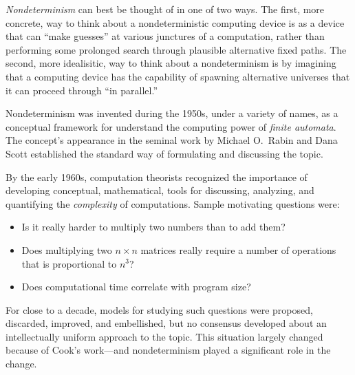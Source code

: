 \medskip

{\it Nondeterminism} can best be thought of in one of two ways.  The
first, more concrete, way to think about a nondeterministic computing
device is as a device that can ``make guesses'' at various junctures
of a computation, rather than performing some prolonged search through
plausible alternative fixed paths.  The second, more idealisitic, way
to think about a nondeterminism is by imagining that a computing
device has the capability of spawning alternative universes that it
can proceed through ``in parallel.''

\bigskip

\noindent {}
\bigskip

\noindent 
Nondeterminism was invented during the 1950s, under a variety of
names, as a conceptual framework for understand the computing power of
{\it finite automata}.   The concept's
appearance in the seminal work \cite{RabinS59} by Michael O.~Rabin
 and Dana Scott 
established the standard way of formulating and discussing the topic.

\medskip

By the early 1960s, computation theorists recognized the importance of
developing conceptual, mathematical, tools for discussing, analyzing,
and quantifying the {\it complexity} of computations.  Sample
motivating questions were:
\begin{itemize}
\item
Is it really harder to multiply two numbers than to add them?
\item
Does multiplying two $n \times n$ matrices really require
a number of operations that is proportional to $n^3$?
\item
Does computational time correlate with program size?
\end{itemize}
For close to a decade, models for studying such questions were
proposed, discarded, improved, and embellished, but no consensus
developed about an intellectually uniform approach to the topic.  This
situation largely changed because of Cook's work---and nondeterminism
played a significant role in the change.

